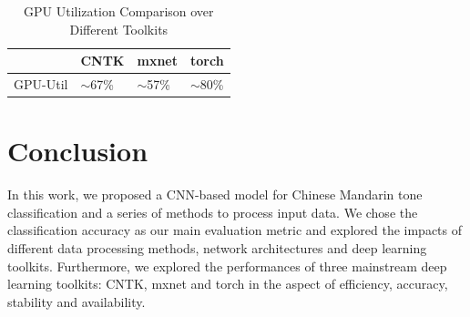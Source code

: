 \documentclass[a4paper, 11pt]{article} %
\begin{document}
\begin{table}[H]
\centering
\begin{tabular}{l|l|l|l}
         & CNTK       & mxnet      & torch      \\ \hline
GPU-Util & $\sim$67\% & $\sim$57\% & $\sim$80\%
\end{tabular}
\caption{GPU Utilization Comparison over Different Toolkits}
\label{my-label}
\end{table}

\newpage

\section{Conclusion}
In this work, we proposed a CNN-based model for Chinese Mandarin tone classification and a series of methods to process input data. 
We chose the classification accuracy as our main evaluation metric and explored the impacts of different data processing methods, network architectures and deep learning toolkits. Furthermore, we explored the performances of three mainstream deep learning toolkits: CNTK, mxnet and torch in the aspect of efficiency, accuracy, stability and availability. \cite{A}



\end{document}
